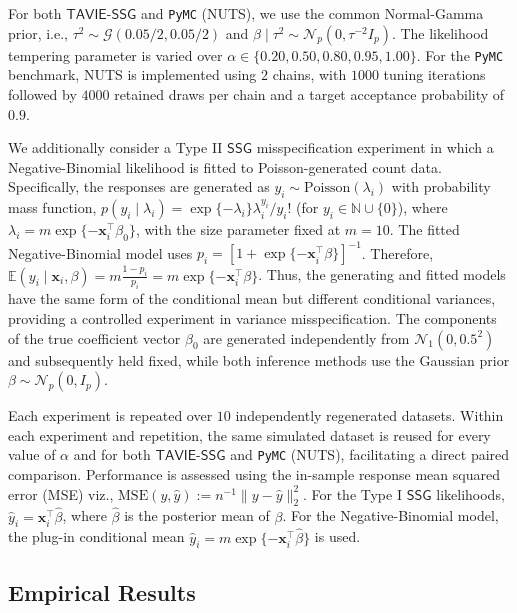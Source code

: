 \documentclass[12pt]{article}
\numberwithin{equation}{section}
\newcommand{\ssg}{\mathsf{SSG}}
\newcommand{\tssg}{\mathsf{TAVIE}\text{-}\mathsf{SSG}}
\begin{document}
For both $\tssg$ and \texttt{PyMC} (NUTS), we use the common Normal-Gamma prior, i.e., $\tau^{2} \sim \mathcal{G}(0.05/2, 0.05/2)$ and $\beta\mid \tau^{2} \sim \mathcal{N}_{p}(0, \tau^{-2}I_{p})$. The likelihood tempering parameter is varied over $\alpha \in \{0.20,0.50,0.80,0.95,1.00\}$. For the \texttt{PyMC} benchmark, NUTS is implemented using $2$ chains, with $1000$ tuning iterations followed by $4000$ retained draws per chain and a target acceptance probability of $0.9$.

We additionally consider a Type II $\ssg$ misspecification experiment in which a Negative-Binomial likelihood is fitted to Poisson-generated count data. Specifically, the responses are generated as $y_i \sim \mathrm{Poisson}(\lambda_i)$ with probability mass function, $p(y_i \mid \lambda_i) = \exp\{-\lambda_i\}\lambda_i^{y_i}/y_i!$ (for $y_i \in \mathbb{N} \cup \{0\}$), where $\lambda_i = m\exp\{-\mathbf{x}_i^{\top}\beta_0\}$, with the size parameter fixed at $m=10$. The fitted Negative-Binomial model uses $p_i = [1 + \exp\{-\mathbf{x}_i^{\top}\beta\}]^{-1}$. Therefore, $\mathbb{E}(y_i\mid \mathbf{x}_i,\beta) = m\frac{1-p_i}{p_i} = m\exp\{-\mathbf{x}_i^{\top}\beta\}$. Thus, the generating and fitted models have the same form of the conditional mean but different conditional variances, providing a controlled experiment in variance misspecification. The components of the true coefficient vector $\beta_0$ are generated independently from $\mathcal{N}_1(0, 0.5^{2})$ and subsequently held fixed, while both inference methods use the Gaussian prior $\beta \sim \mathcal{N}_{p}(0, I_{p})$.

Each experiment is repeated over $10$ independently regenerated datasets. Within each experiment and repetition, the same simulated dataset is reused for every value of $\alpha$ and for both $\tssg$ and \texttt{PyMC} (NUTS), facilitating a direct paired comparison. Performance is assessed using the in-sample response mean squared error (MSE) viz., $\mathrm{MSE}(y, \widehat{y}) := n^{-1}\|y-\widehat{y}\|^{2}_{2}$. For the Type I $\ssg$ likelihoods, $\widehat{y}_{i} = \mathbf{x}_i^{\top}\widehat{\beta}$, where $\widehat{\beta}$ is the posterior mean of $\beta$. For the Negative-Binomial model, the plug-in conditional mean $\widehat{y}_i = m\exp\{-\mathbf{x}_i^{\top}\widehat{\beta}\}$ is used.

\subsection{Empirical Results}
\label{app:model-misspecification-empirics-results}
\end{document}
